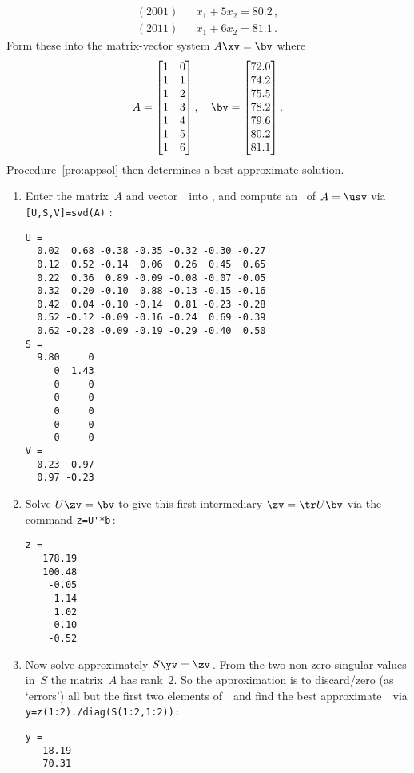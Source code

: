 \begin{example}
\begin{solution}
\begin{eqnarray*}
\\(2001)&&x_1+5x_2=80.2\,,
\\(2011)&&x_1+6x_2=81.1\,.
\end{eqnarray*}
Form these into the matrix-vector system \(A\xv=\bv\) where
\begin{equation*}
A= \begin{bmatrix} 1&0\\1&1\\1&2\\1&3\\1&4\\1&5\\1&6 \end{bmatrix},
\quad \bv=\begin{bmatrix}72.0\\74.2\\75.5\\78.2\\79.6\\80.2\\81.1\end{bmatrix}.
\end{equation*}
Procedure~\ref{pro:appsol} then determines a best approximate solution.
\begin{enumerate}
\item Enter the matrix~\(A\) and vector~\bv\ into \script, and compute an \svd\ of \(A=\usv\) via \verb|[U,S,V]=svd(A)| \twodp:
\setbox\ajrqrbox\hbox{}%
\marginpar{\usebox{\ajrqrbox\\[2ex]}}%
\begin{verbatim}
U =
  0.02  0.68 -0.38 -0.35 -0.32 -0.30 -0.27
  0.12  0.52 -0.14  0.06  0.26  0.45  0.65
  0.22  0.36  0.89 -0.09 -0.08 -0.07 -0.05
  0.32  0.20 -0.10  0.88 -0.13 -0.15 -0.16
  0.42  0.04 -0.10 -0.14  0.81 -0.23 -0.28
  0.52 -0.12 -0.09 -0.16 -0.24  0.69 -0.39
  0.62 -0.28 -0.09 -0.19 -0.29 -0.40  0.50
S =
  9.80     0
     0  1.43
     0     0
     0     0
     0     0
     0     0
     0     0
V =
  0.23  0.97
  0.97 -0.23
\end{verbatim}
\item Solve \(U\zv=\bv\) to give this first intermediary \(\zv=\tr U\bv\) via the command \verb|z=U'*b|\,:
\begin{verbatim}
z =
   178.19
   100.48
    -0.05
     1.14
     1.02
     0.10
    -0.52
\end{verbatim}

\item Now solve approximately \(S\yv=\zv\)\,. 
From the two non-zero singular values in~\(S\) the matrix~\(A\) has rank~\(2\).
So the approximation is to discard\slash zero (as `errors') all but the first two elements of~\zv\ and find the best approximate~\yv\ via \verb|y=z(1:2)./diag(S(1:2,1:2))|\,:
\begin{verbatim}
y =
   18.19
   70.31
\end{verbatim}


\end{enumerate}
\end{solution}
\end{example}
